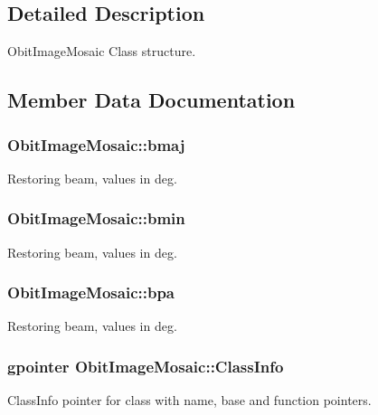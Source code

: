 \subsection{Detailed Description}
Obit\-Image\-Mosaic Class structure. 



\subsection{Member Data Documentation}
\subsubsection{ {\bf Obit\-Image\-Mosaic::bmaj}}\label{structObitImageMosaic_o27}


Restoring beam, values in deg. 

\subsubsection{ {\bf Obit\-Image\-Mosaic::bmin}}\label{structObitImageMosaic_o28}


Restoring beam, values in deg. 

\subsubsection{ {\bf Obit\-Image\-Mosaic::bpa}}\label{structObitImageMosaic_o29}


Restoring beam, values in deg. 

\subsubsection{\setlength{\rightskip}{0pt plus 5cm}gpointer {\bf Obit\-Image\-Mosaic::Class\-Info}}\label{structObitImageMosaic_o1}


Class\-Info pointer for class with name, base and function pointers. 


